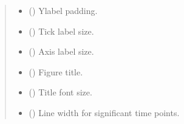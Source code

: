 \documentclass[letterpaper,10pt,english]{sphinxhowto}
\begin{document}
\begin{fulllineitems}
\begin{quote}
\begin{description}
\begin{itemize}
\item {} 
\sphinxAtStartPar
{} (\sphinxstyleliteralemphasis{\sphinxupquote{, }}) \textendash{} Y\sphinxhyphen{}label padding.

\item {} 
\sphinxAtStartPar
{} (\sphinxstyleliteralemphasis{\sphinxupquote{, }}) \textendash{} Tick label size.

\item {} 
\sphinxAtStartPar
{} (\sphinxstyleliteralemphasis{\sphinxupquote{, }}) \textendash{} Axis label size.

\item {} 
\sphinxAtStartPar
{} (\sphinxstyleliteralemphasis{\sphinxupquote{, }}) \textendash{} Figure title.

\item {} 
\sphinxAtStartPar
{} (\sphinxstyleliteralemphasis{\sphinxupquote{, }}) \textendash{} Title font size.

\item {} 
\sphinxAtStartPar
{} (\sphinxstyleliteralemphasis{\sphinxupquote{, }}) \textendash{} Line width for significant time points.


\end{itemize}
\end{description}
\end{quote}
\end{fulllineitems}
\end{document}
